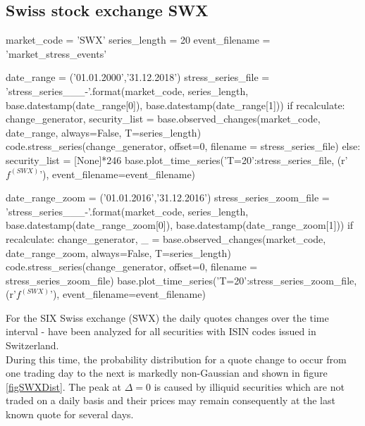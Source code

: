 \documentclass[11pt,twoside,a4paper]{article}
\numberwithin{equation}{section}
\numberwithin{figure}{section}
\numberwithin{table}{section}
\begin{document}
\subsection{Swiss stock exchange SWX}
\begin{pycode}
market_code = 'SWX'
series_length = 20
event_filename = 'market_stress_events'

date_range = ('01.01.2000','31.12.2018')
stress_series_file = 'stress_series_{}_{}_{}-{}'.format(market_code, series_length, base.datestamp(date_range[0]), base.datestamp(date_range[1]))
if recalculate:
	change_generator, security_list = base.observed_changes(market_code, date_range, always=False, T=series_length)
	code.stress_series(change_generator, offset=0, filename = stress_series_file)
else:
	security_list = [None]*246
base.plot_time_series({'T=20':stress_series_file},  (r'$f^{(SWX)}$'), event_filename=event_filename)

date_range_zoom = ('01.01.2016','31.12.2016')
stress_series_zoom_file = 'stress_series_{}_{}_{}-{}'.format(market_code, series_length, base.datestamp(date_range_zoom[0]), base.datestamp(date_range_zoom[1]))
if recalculate:
	change_generator, _ = base.observed_changes(market_code, date_range_zoom, always=False, T=series_length)
	code.stress_series(change_generator, offset=0, filename = stress_series_zoom_file)
base.plot_time_series({'T=20':stress_series_zoom_file}, (r'$f^{(SWX)}$'), event_filename=event_filename)
\end{pycode}
For the SIX Swiss exchange (SWX) the daily quotes changes over the time interval  -   have been analyzed for all  securities with ISIN codes issued in Switzerland.\\
During this time, the probability distribution for a quote change to occur from one trading day to the next is markedly non-Gaussian and shown in figure \ref{figSWXDist}. The peak at $\Delta=0$ is caused by illiquid securities which are not traded on a daily basis and their prices may remain consequently at the last known quote for several days.\\
\end{document}
